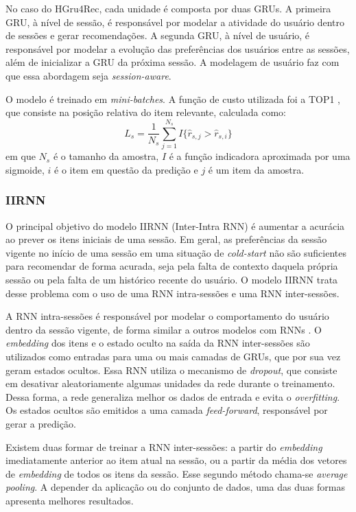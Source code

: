 No caso do HGru4Rec, cada unidade é composta por duas GRUs. A primeira GRU, à
nível de sessão, é responsável por modelar a atividade do usuário dentro de
sessões e gerar recomendações. A segunda GRU, à nível de usuário, é responsável
por modelar a evolução das preferências dos usuários entre as sessões, além de
inicializar a GRU da próxima sessão. A modelagem de usuário faz com que essa abordagem
seja \textit{session-aware}.

O modelo é treinado em \textit{mini-batches}. A função de custo utilizada foi a
  TOP1 \cite{HidasiKBT15}, que consiste na posição relativa do item relevante,
  calculada como:
  \begin{equation}
    L_s = \frac{1}{N_s} \sum_{j=1}^{N_s}I\{ \hat{r}_{s,j} > \hat{r}_{s,i}\}
  \end{equation}
  em que $N_s$ é o tamanho da amostra, $I$ é a função indicadora aproximada por
  uma sigmoide, $i$ é o item em questão da predição e $j$ é um item da amostra.

\subsubsection{IIRNN}
  O principal objetivo do modelo IIRNN (Inter-Intra RNN) é aumentar a acurácia
ao prever os itens iniciais de uma sessão. Em geral, as preferências da sessão
vigente no início de uma sessão em uma situação de \textit{cold-start} não são
suficientes para recomendar de forma acurada, seja pela falta de contexto
daquela própria sessão ou pela falta de um histórico recente do usuário. O
modelo IIRNN trata desse problema com o uso de uma RNN intra-sessões e uma RNN
inter-sessões.

A RNN intra-sessões é responsável por modelar o comportamento do usuário dentro
da sessão vigente, de forma similar a outros modelos com RNNs
\cite{HidasiKBT15}. O \textit{embedding} dos itens e o estado oculto na saída da
RNN inter-sessões são utilizados como entradas para uma ou mais camadas de GRUs,
que por sua vez geram estados ocultos. Essa RNN utiliza o mecanismo de
\textit{dropout}, que consiste em desativar aleatoriamente algumas unidades da
rede durante o treinamento. Dessa forma, a rede generaliza melhor os dados de
entrada e evita o \textit{overfitting}. Os estados ocultos são emitidos a uma camada
\textit{feed-forward}, responsável por gerar a predição.

Existem duas formar de treinar a RNN inter-sessões: a partir do
\textit{embedding} imediatamente anterior ao item atual na sessão, ou a partir
da média dos vetores de \textit{embedding} de todos os itens da sessão. Esse
segundo método chama-se \textit{average pooling}. A depender da aplicação ou do
conjunto de dados, uma das duas formas apresenta melhores resultados.

